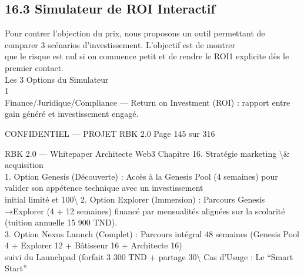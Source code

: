 \documentclass[12pt,landscape,a4paper]{article}
\newenvironment{confidential}
{\begin{tcolorbox}[
    colback=rbkred!5!white,
    colframe=rbkred!75!black,
    title=CONFIDENTIEL,
    fonttitle=\bfseries\color{white},
    coltitle=rbkred!75!black,
    breakable,
    enhanced,
    frame hidden,
    borderline west={2pt}{0pt}{rbkred!75!black}
]}
{\end{tcolorbox}}
\begin{document}
\subsection{16.3 Simulateur de ROI Interactif}
Pour contrer l’objection du prix, nous proposons un outil permettant de comparer 3 scénarios d’investissement. L’objectif est de montrer\\
que le risque est nul si on commence petit et de rendre le ROI1 explicite dès le premier contact.\\
\vspace{0.5em}
Les 3 Options du Simulateur\\
1\\
Finance/Juridique/Compliance — Return on Investment (ROI) : rapport entre gain généré et investissement engagé.\\
\vspace{0.5em}
\vspace{0.5em}
\vspace{0.5em}
\begin{confidential}CONFIDENTIEL — PROJET RBK 2.0                                              Page 145 sur 316\end{confidential}
RBK 2.0 — Whitepaper Architecte Web3                                                              Chapitre 16. Stratégie marketing \textbackslash{}& acquisition\\
\vspace{0.5em}
\vspace{0.5em}
1. Option Genesis (Découverte) : Accès à la Genesis Pool (4 semaines) pour valider son appétence technique avec un investissement\\
initial limité et 100\textbackslash{}%
\vspace{0.5em}
2. Option Explorer (Immersion) : Parcours Genesis →Explorer (4 + 12 semaines) financé par mensualités alignées sur la scolarité\\
(tuition annuelle 15 900 TND).\\
\vspace{0.5em}
3. Option Nexus Launch (Complet) : Parcours intégral 48 semaines (Genesis Pool 4 + Explorer 12 + Bâtisseur 16 + Architecte 16)\\
suivi du Launchpad (forfait 3 300 TND + partage 30\textbackslash{}%
\vspace{0.5em}
Cas d’Usage : Le “Smart Start”\\
\end{document}
